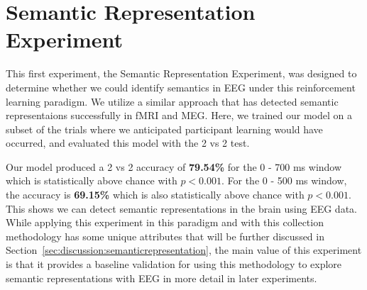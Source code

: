 \section{Semantic Representation Experiment}
This first experiment, the Semantic Representation Experiment, was designed to 
determine whether we could identify semantics in EEG under this reinforcement 
learning paradigm. We utilize a similar approach that has detected semantic 
representaions successfully in fMRI and MEG. Here, we trained our model on a 
subset of the trials where we anticipated participant learning would have 
occurred, and evaluated this model with the 2 vs 2 test. 

Our model produced a 2 vs 2 accuracy of \textbf{79.54\%} for the 0 - 700 ms 
window which is statistically above chance with $p < 0.001$. For the 0 - 500 ms 
window, the \tvt accuracy is \textbf{69.15\%} which is also statistically above 
chance with $p < 0.001$. This shows we can detect semantic representations in 
the brain using EEG data.  While applying this experiment in this paradigm and 
with this collection methodology has some unique attributes that will be 
further discussed in Section~\ref{sec:discussion:semanticrepresentation}, the 
main value of this experiment is that it provides a baseline validation for 
using this methodology to explore semantic representations with EEG in more 
detail in later experiments. 
